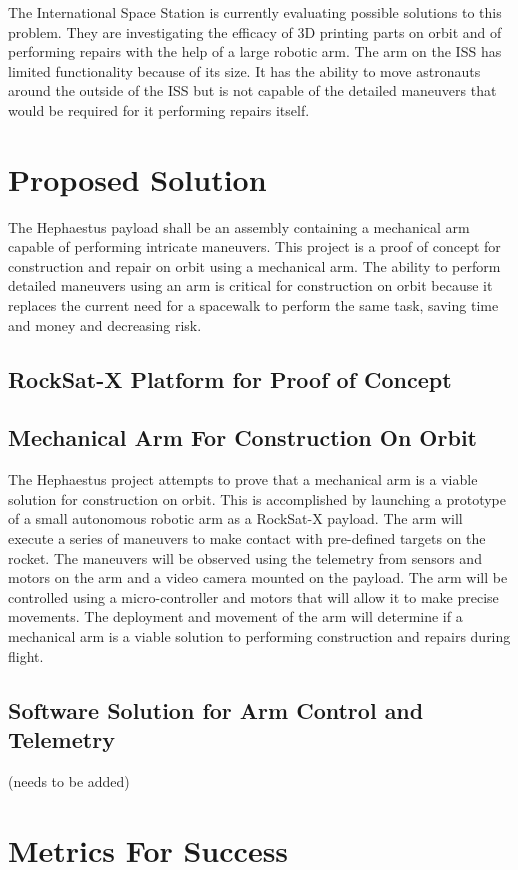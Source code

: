 \documentclass[letterpaper,10pt]{article}
\begin{document}
The International Space Station is currently evaluating possible solutions to this problem. They are 
investigating the efficacy of 3D printing parts on orbit and of performing repairs with the help of 
a large robotic arm. The arm on the ISS has limited functionality because of its size.
 It has the ability to move astronauts around the outside of the ISS but is not capable of the detailed maneuvers that would be required for it performing repairs itself.


\section{Proposed Solution}
The Hephaestus payload shall be an assembly containing a mechanical arm capable of performing intricate maneuvers.
This project is a proof of concept for construction and repair on orbit using a mechanical arm. 
The ability to perform detailed maneuvers using an arm is critical for construction on orbit because
it replaces the current need for a spacewalk to perform the same task, saving time and money and decreasing risk.

\subsection{RockSat-X Platform for Proof of Concept}
\subsection{Mechanical Arm For Construction On Orbit}
The Hephaestus project attempts to prove that a mechanical arm is a viable solution for construction on orbit.
This is accomplished by launching a prototype of a small autonomous robotic arm as a RockSat-X payload.
The arm will execute a series of maneuvers to make contact with pre-defined targets on the rocket.
The maneuvers will be observed using the telemetry from sensors and motors on the arm and a video camera mounted on the payload.
The arm will be controlled using a micro-controller and motors that will allow it to make precise movements.
The deployment and movement of the arm will determine if a mechanical arm is a viable solution to performing construction and repairs during flight.
\subsection{Software Solution for Arm Control and Telemetry}
(needs to be added)
\section{Metrics For Success}
\end{document}
